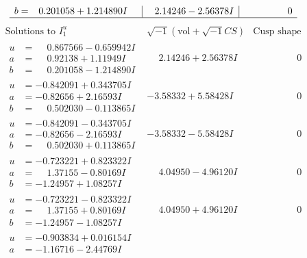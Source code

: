 \documentclass[1p]{elsarticle_modified}
\theoremstyle{definition}
\newcommand{\I}{\sqrt{-1}}
\begin{document}
$$\begin{array}{c|c|c}
\begin{aligned}
b &= \phantom{-}0.201058 + 1.214890 I\end{aligned}
 & \phantom{-}2.14246 - 2.56378 I & \phantom{-0.000000 } 0\\
 \hline 
 \end{array}$$\newpage$$\begin{array}{c|c|c}  
\text{Solutions to }I^u_{1}& \I (\text{vol} + \sqrt{-1}CS) & \text{Cusp shape}\\
 \hline 
\begin{aligned}
u &= \phantom{-}0.867566 - 0.659942 I \\
a &= \phantom{-}0.92138 + 1.11949 I \\
b &= \phantom{-}0.201058 - 1.214890 I\end{aligned}
 & \phantom{-}2.14246 + 2.56378 I & \phantom{-0.000000 } 0 \\ \hline\begin{aligned}
u &= -0.842091 + 0.343705 I \\
a &= -0.82656 + 2.16593 I \\
b &= \phantom{-}0.502030 - 0.113865 I\end{aligned}
 & -3.58332 + 5.58428 I & \phantom{-0.000000 } 0 \\ \hline\begin{aligned}
u &= -0.842091 - 0.343705 I \\
a &= -0.82656 - 2.16593 I \\
b &= \phantom{-}0.502030 + 0.113865 I\end{aligned}
 & -3.58332 - 5.58428 I & \phantom{-0.000000 } 0 \\ \hline\begin{aligned}
u &= -0.723221 + 0.823322 I \\
a &= \phantom{-}1.37155 - 0.80169 I \\
b &= -1.24957 + 1.08257 I\end{aligned}
 & \phantom{-}4.04950 - 4.96120 I & \phantom{-0.000000 } 0 \\ \hline\begin{aligned}
u &= -0.723221 - 0.823322 I \\
a &= \phantom{-}1.37155 + 0.80169 I \\
b &= -1.24957 - 1.08257 I\end{aligned}
 & \phantom{-}4.04950 + 4.96120 I & \phantom{-0.000000 } 0 \\ \hline\begin{aligned}
u &= -0.903834 + 0.016154 I \\
a &= -1.16716 - 2.44769 I \\

\end{aligned}
\end{array}$$
\end{document}
